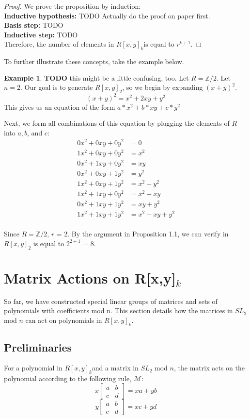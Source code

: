 \documentclass[a4paper,draft]{amsproc}
\theoremstyle{plain}
\theoremstyle{definition}
\newtheorem{exm}{Example}[section]
\theoremstyle{remark}
\numberwithin{equation}{section}
\begin{document}
\begin{proof}
We prove the proposition by induction: \\
\textbf{Inductive hypothesis: } TODO Actually do the proof on paper first. \\
\textbf{Basis step: } TODO \\
\textbf{Inductive step:} TODO \\

Therefore, the number of elements in $R[x,y]_{k}$is equal to $r^{k + 1}$. 
\end{proof}
To further illustrate these concepts, take the example below. 
\begin{exm}
\textbf{TODO} this might be a little confusing, too. 
Let $R = \mathbb{Z}/2$.  Let $n = 2$. Our goal is to generate $R[x,y]_{2}$, so we begin by expanding $(x + y)^{2}$. 
$$(x + y)^{2} = x^{2} + 2xy + y^{2} $$
This gives us an equation of the form $a*x^{2} + b*xy + c*y^{2} $

Next, we form all combinations of this equation by plugging the elements of $R$ into $a, b$, and $c$: 
\begin{align*}
0x^{2} + 0xy + 0y^{2} &= 0 \\
1x^{2} + 0xy + 0y^{2} &= x^{2} \\
0x^{2} +1xy + 0y^{2}  &= xy \\
0x^{2} + 0xy + 1y^{2} &= y^{2} \\
1x^{2} + 0xy + 1y^{2} &= x^{2} + y^{2} \\
1x^{2} + 1xy + 0y^{2} &= x^{2} + xy \\
0x^{2} + 1xy + 1y^{2} &= xy + y^{2} \\
1x^{2} + 1xy + 1y^{2}  &= x^{2} + xy + y^{2}\\
\end{align*}

Since  $R = \mathbb{Z}/2$, $r$ = 2. By the argument in Proposition 1.1, we can verify  in $R[x,y]_{2}$ is equal to $2^{2 + 1}$ = 8.
\end{exm}

\section{Matrix Actions on R[x,y]$_{k}$} 
So far, we have constructed special linear groups of matrices and sets of polynomials with coefficients mod n. This section details how the matrices in $SL_{2}$ mod $n$ can act on polynomials in $R[x,y]_{k}$. 

\subsection{Preliminaries}
For a polynomial in $R[x,y]_{k}$and a matrix in $SL_{2}$ mod $n$, the matrix acts on the polynomial according to the following rule, $\mathcal{M}$: 
$$
x\begin{bmatrix}
 a&b \\ 
 c&d 
\end{bmatrix} = xa + yb 
$$
$$
y\begin{bmatrix}
 a&b \\ 
 c&d 
\end{bmatrix} = xc + yd 
$$
\end{document}
